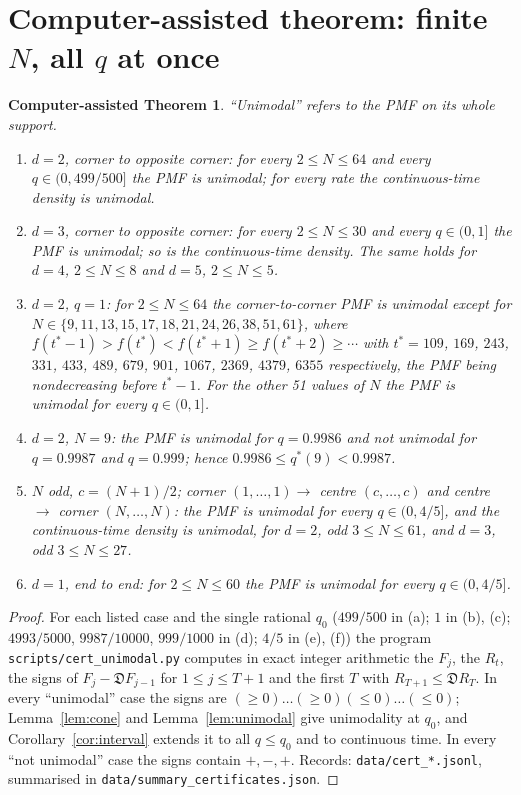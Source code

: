\documentclass[11pt,a4paper]{article}
\newtheorem{catheorem}[theorem]{Computer-assisted Theorem}
\theoremstyle{definition}
\newcommand{\fD}{\mathfrak D}
\begin{document}
\section{Computer-assisted theorem: finite $N$, all $q$ at once}\label{sec:ca}

\begin{catheorem}\label{thm:ca}
``Unimodal'' refers to the PMF on its whole support.
\begin{enumerate}
\item[(a)] $d=2$, corner to opposite corner: for every $2\le N\le64$ and every $q\in(0,499/500]$ the PMF is unimodal; for every rate the continuous-time density is unimodal.
\item[(b)] $d=3$, corner to opposite corner: for every $2\le N\le30$ and every $q\in(0,1]$ the PMF is unimodal; so is the continuous-time density. The same holds for $d=4$, $2\le N\le8$ and $d=5$, $2\le N\le5$.
\item[(c)] $d=2$, $q=1$: for $2\le N\le64$ the corner-to-corner PMF is unimodal except for
$N\in\{9,11,13,15,17,18,21,24,26,38,51,61\}$, where $f(t^*-1)>f(t^*)<f(t^*+1)\ge f(t^*+2)\ge\cdots$ with $t^*=109$, $169$, $243$, $331$, $433$, $489$, $679$, $901$, $1067$, $2369$, $4379$, $6355$ respectively, the PMF being nondecreasing before $t^*-1$. For the other 51 values of $N$ the PMF is unimodal for every $q\in(0,1]$.
\item[(d)] $d=2$, $N=9$: the PMF is unimodal for $q=0.9986$ and not unimodal for $q=0.9987$ and $q=0.999$; hence $0.9986\le q^*(9)<0.9987$.
\item[(e)] $N$ odd, $c=(N+1)/2$; corner $(1,\dots,1)\to$ centre $(c,\dots,c)$ and centre $\to$ corner $(N,\dots,N)$: the PMF is unimodal for every $q\in(0,4/5]$, and the continuous-time density is unimodal, for $d=2$, odd $3\le N\le61$, and $d=3$, odd $3\le N\le27$.
\item[(f)] $d=1$, end to end: for $2\le N\le60$ the PMF is unimodal for every $q\in(0,4/5]$.
\end{enumerate}
\end{catheorem}
\begin{proof}
For each listed case and the single rational $q_0$ ($499/500$ in (a); $1$ in (b), (c); $4993/5000$, $9987/10000$, $999/1000$ in (d); $4/5$ in (e), (f)) the program \texttt{scripts/cert\_unimodal.py} computes in exact integer arithmetic the $F_j$, the $R_t$, the signs of $F_j-\fD F_{j-1}$ for $1\le j\le T+1$ and the first $T$ with $R_{T+1}\le\fD R_T$. In every ``unimodal'' case the signs are $(\ge0)\dots(\ge0)(\le0)\dots(\le0)$; Lemma~\ref{lem:cone} and Lemma~\ref{lem:unimodal} give unimodality at $q_0$, and Corollary~\ref{cor:interval} extends it to all $q\le q_0$ and to continuous time. In every ``not unimodal'' case the signs contain $+,-,+$. Records: \texttt{data/cert\_*.jsonl}, summarised in \texttt{data/summary\_certificates.json}.
\end{proof}
\end{document}
